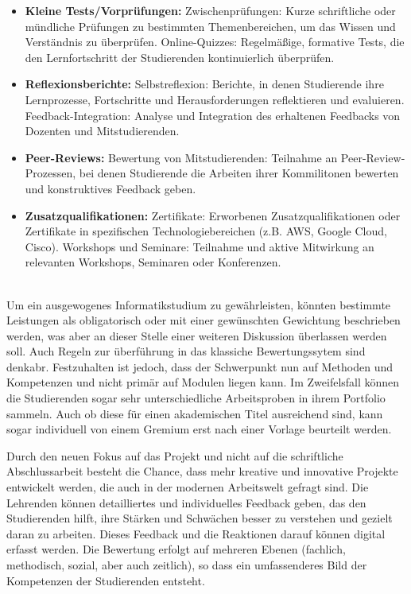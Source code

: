 \documentclass[conference]{IEEEtran}
\begin{document}
\begin{itemize}[leftmargin=*]
    \item \textbf{Kleine Tests/Vorprüfungen:}
    \newline Zwischenprüfungen: Kurze schriftliche oder mündliche Prüfungen zu bestimmten Themenbereichen, um das Wissen und Verständnis zu überprüfen.
    \newline Online-Quizzes: Regelmäßige, formative Tests, die den Lernfortschritt der Studierenden kontinuierlich überprüfen.

    \item \textbf{Reflexionsberichte:}
    \newline Selbstreflexion: Berichte, in denen Studierende ihre Lernprozesse, Fortschritte und Herausforderungen reflektieren und evaluieren.
    \newline Feedback-Integration: Analyse und Integration des erhaltenen Feedbacks von Dozenten und Mitstudierenden.

    \item \textbf{Peer-Reviews:}
    \newline Bewertung von Mitstudierenden: Teilnahme an Peer-Review-Prozessen, bei denen Studierende die Arbeiten ihrer Kommilitonen bewerten und konstruktives Feedback geben.

    \item \textbf{Zusatzqualifikationen:}
    \newline Zertifikate: Erworbenen Zusatzqualifikationen oder Zertifikate in spezifischen Technologiebereichen (z.B. AWS, Google Cloud, Cisco).
    \newline Workshops und Seminare: Teilnahme und aktive Mitwirkung an relevanten Workshops, Seminaren oder Konferenzen.
\end{itemize}
\mbox{}\\
Um ein ausgewogenes Informatikstudium zu gewährleisten, könnten bestimmte Leistungen als obligatorisch oder mit einer gewünschten Gewichtung beschrieben werden, was aber an dieser Stelle einer weiteren Diskussion überlassen werden soll. Auch Regeln zur überführung in das klassiche Bewertungssytem sind denkabr. Festzuhalten ist jedoch, dass der Schwerpunkt nun auf Methoden und Kompetenzen und nicht primär auf Modulen liegen kann. Im Zweifelsfall können die Studierenden sogar sehr unterschiedliche Arbeitsproben in ihrem Portfolio sammeln. Auch ob diese für einen akademischen Titel ausreichend sind, kann sogar individuell von einem Gremium erst nach einer Vorlage beurteilt werden. 

Durch den neuen Fokus auf das Projekt und nicht auf die schriftliche Abschlussarbeit besteht die Chance, dass mehr kreative und innovative Projekte entwickelt werden, die auch in der modernen Arbeitswelt gefragt sind. Die Lehrenden können detailliertes und individuelles Feedback geben, das den Studierenden hilft, ihre Stärken und Schwächen besser zu verstehen und gezielt daran zu arbeiten. Dieses Feedback und die Reaktionen darauf können digital erfasst werden. Die Bewertung erfolgt auf mehreren Ebenen (fachlich, methodisch, sozial, aber auch zeitlich), so dass ein umfassenderes Bild der Kompetenzen der Studierenden entsteht.
\end{document}
